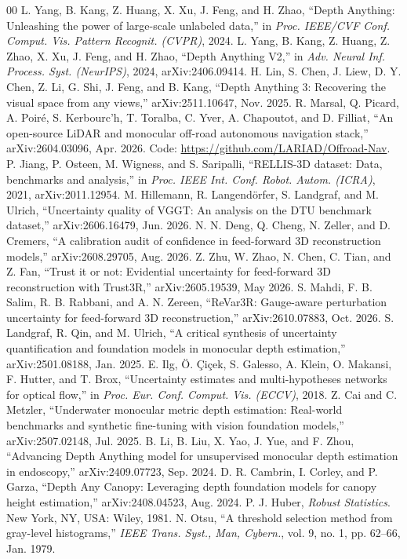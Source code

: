 \documentclass[conference]{IEEEtran}
\begin{document}
\begin{thebibliography}{00}
 L. Yang, B. Kang, Z. Huang, X. Xu, J. Feng, and H. Zhao, ``Depth Anything: Unleashing the power of large-scale unlabeled data,'' in \emph{Proc. IEEE/CVF Conf. Comput. Vis. Pattern Recognit. (CVPR)}, 2024.
 L. Yang, B. Kang, Z. Huang, Z. Zhao, X. Xu, J. Feng, and H. Zhao, ``Depth Anything V2,'' in \emph{Adv. Neural Inf. Process. Syst. (NeurIPS)}, 2024, arXiv:2406.09414.
 H. Lin, S. Chen, J. Liew, D. Y. Chen, Z. Li, G. Shi, J. Feng, and B. Kang, ``Depth Anything 3: Recovering the visual space from any views,'' arXiv:2511.10647, Nov. 2025.
 R. Marsal, Q. Picard, A. Poir\'e, S. Kerbourc'h, T. Toralba, C. Yver, A. Chapoutot, and D. Filliat, ``An open-source LiDAR and monocular off-road autonomous navigation stack,'' arXiv:2604.03096, Apr. 2026. Code: \url{https://github.com/LARIAD/Offroad-Nav}.
 P. Jiang, P. Osteen, M. Wigness, and S. Saripalli, ``RELLIS-3D dataset: Data, benchmarks and analysis,'' in \emph{Proc. IEEE Int. Conf. Robot. Autom. (ICRA)}, 2021, arXiv:2011.12954.
 M. Hillemann, R. Langend\"orfer, S. Landgraf, and M. Ulrich, ``Uncertainty quality of VGGT: An analysis on the DTU benchmark dataset,'' arXiv:2606.16479, Jun. 2026.
 N. N. Deng, Q. Cheng, N. Zeller, and D. Cremers, ``A calibration audit of confidence in feed-forward 3D reconstruction models,'' arXiv:2608.29705, Aug. 2026.
 Z. Zhu, W. Zhao, N. Chen, C. Tian, and Z. Fan, ``Trust it or not: Evidential uncertainty for feed-forward 3D reconstruction with Trust3R,'' arXiv:2605.19539, May 2026.
 S. Mahdi, F. B. Salim, R. B. Rabbani, and A. N. Zereen, ``ReVar3R: Gauge-aware perturbation uncertainty for feed-forward 3D reconstruction,'' arXiv:2610.07883, Oct. 2026.
 S. Landgraf, R. Qin, and M. Ulrich, ``A critical synthesis of uncertainty quantification and foundation models in monocular depth estimation,'' arXiv:2501.08188, Jan. 2025.
 E. Ilg, \"O. \c{C}i\c{c}ek, S. Galesso, A. Klein, O. Makansi, F. Hutter, and T. Brox, ``Uncertainty estimates and multi-hypotheses networks for optical flow,'' in \emph{Proc. Eur. Conf. Comput. Vis. (ECCV)}, 2018.
 Z. Cai and C. Metzler, ``Underwater monocular metric depth estimation: Real-world benchmarks and synthetic fine-tuning with vision foundation models,'' arXiv:2507.02148, Jul. 2025.
 B. Li, B. Liu, X. Yao, J. Yue, and F. Zhou, ``Advancing Depth Anything model for unsupervised monocular depth estimation in endoscopy,'' arXiv:2409.07723, Sep. 2024.
 D. R. Cambrin, I. Corley, and P. Garza, ``Depth Any Canopy: Leveraging depth foundation models for canopy height estimation,'' arXiv:2408.04523, Aug. 2024.
 P. J. Huber, \emph{Robust Statistics}. New York, NY, USA: Wiley, 1981.
 N. Otsu, ``A threshold selection method from gray-level histograms,'' \emph{IEEE Trans. Syst., Man, Cybern.}, vol. 9, no. 1, pp. 62--66, Jan. 1979.
\end{thebibliography}
\end{document}
